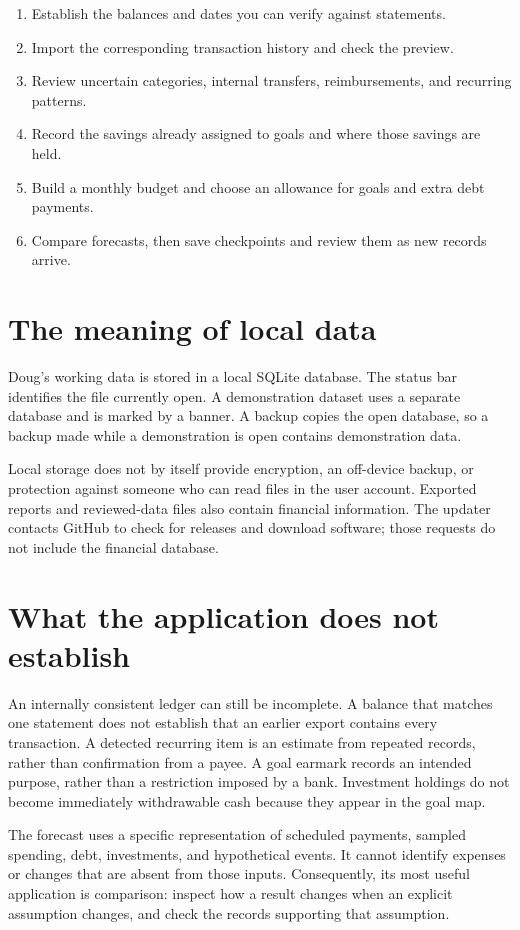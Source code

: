 \begin{enumerate}
\item Establish the balances and dates you can verify against statements.
\item Import the corresponding transaction history and check the preview.
\item Review uncertain categories, internal transfers, reimbursements, and recurring patterns.
\item Record the savings already assigned to goals and where those savings are held.
\item Build a monthly budget and choose an allowance for goals and extra debt payments.
\item Compare forecasts, then save checkpoints and review them as new records arrive.
\end{enumerate}

\section{The meaning of local data}
Doug's working data is stored in a local SQLite database. The status bar identifies the file currently open. A demonstration dataset uses a separate database and is marked by a banner. A backup copies the open database, so a backup made while a demonstration is open contains demonstration data.

Local storage does not by itself provide encryption, an off-device backup, or protection against someone who can read files in the user account. Exported reports and reviewed-data files also contain financial information. The updater contacts GitHub to check for releases and download software; those requests do not include the financial database.

\section{What the application does not establish}
An internally consistent ledger can still be incomplete. A balance that matches one statement does not establish that an earlier export contains every transaction. A detected recurring item is an estimate from repeated records, rather than confirmation from a payee. A goal earmark records an intended purpose, rather than a restriction imposed by a bank. Investment holdings do not become immediately withdrawable cash because they appear in the goal map.

The forecast uses a specific representation of scheduled payments, sampled spending, debt, investments, and hypothetical events. It cannot identify expenses or changes that are absent from those inputs. Consequently, its most useful application is comparison: inspect how a result changes when an explicit assumption changes, and check the records supporting that assumption.


